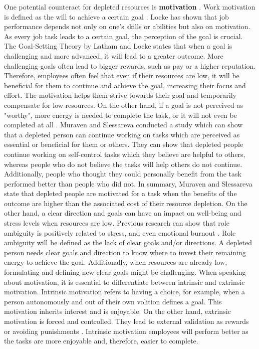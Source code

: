 \documentclass{hasel_thesis}
\begin{document}
One potential counteract for depleted resources is \textbf{motivation} \cite{Bandura.1986}. Work motivation is defined as the will to achieve a certain goal \cite{Locke.2004}. Locke \cite{Locke2000} has shown that job performance depends not only on one's skills or abilities but also on motivation. As every job task leads to a certain goal, the perception of the goal is crucial. The Goal-Setting Theory by Latham and Locke \cite{Latham.1991} states that when a goal is challenging and more advanced, it will lead to a greater outcome. More challenging goals often lead to bigger rewards, such as pay or a higher reputation. Therefore, employees often feel that even if their resources are low, it will be beneficial for them to continue and achieve the goal, increasing their focus and effort. The motivation helps them strive towards their goal and temporarily compensate for low resources. On the other hand, if a goal is not perceived as "worthy", more energy is needed to complete the task, or it will not even be completed at all \cite{Trougakos.2009}. Muraven and Slessareva \cite{Muraven.2003} conducted a study which can show that a depleted person can continue working on tasks which are perceived as essential or beneficial for them or others. They can show that depleted people continue working on self-control tasks which they believe are helpful to others, whereas people who do not believe the tasks will help others do not continue. Additionally, people who thought they could personally benefit from the task performed better than people who did not. In summary, Muraven and Slessareva \cite{Muraven.2003} state that depleted people are motivated for a task when the benefits of the outcome are higher than the associated cost of their resource depletion. On the other hand, a clear direction and goals can have an impact on well-being and stress levels when resources are low. Previous research can show that role ambiguity is positively related to stress, and even emotional burnout \cite{Posig.2003}. Role ambiguity will be defined as the lack of clear goals and/or directions. A depleted person needs clear goals and direction to know where to invest their remaining energy to achieve the goal. Additionally, when resources are already low, formulating and defining new clear goals might be challenging. When speaking about motivation, it is essential to differentiate between intrinsic and extrinsic motivation. Intrinsic motivation refers to having a choice, for example, when a person autonomously and out of their own volition defines a goal. This motivation inherits interest and is enjoyable. On the other hand, extrinsic motivation is forced and controlled. They lead to external validation as rewards or avoiding punishments \cite{Ryan.2000}. Intrinsic motivation employees will perform better as the tasks are more enjoyable and, therefore, easier to complete.
\end{document}
